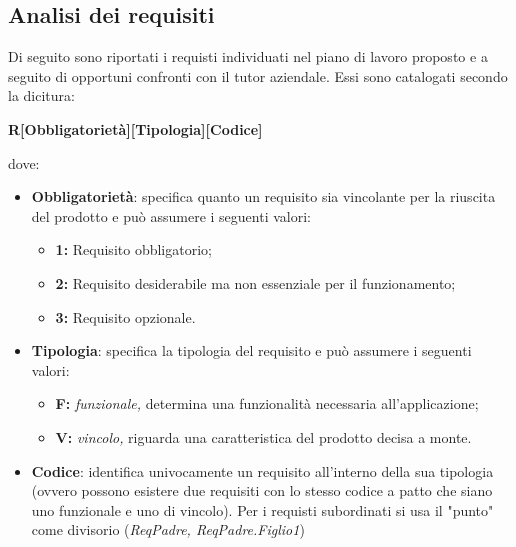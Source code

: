 \subsection{Analisi dei requisiti}
Di seguito sono riportati i requisti individuati nel piano di lavoro proposto e a seguito di opportuni confronti con il tutor aziendale. Essi sono catalogati secondo la dicitura:
\begin{center}
    \textbf{R[Obbligatorietà][Tipologia][Codice]}
\end{center}
dove:
\begin{itemize}
    \item \textbf{Obbligatorietà}: specifica quanto un requisito sia vincolante per la riuscita del prodotto e può assumere i seguenti valori:
    \begin{itemize}
        \item \textbf{1: } Requisito obbligatorio;
        \item \textbf{2: } Requisito desiderabile ma non essenziale per il funzionamento;
        \item \textbf{3: } Requisito opzionale.
    \end{itemize}
    \item \textbf{Tipologia}: specifica la tipologia del requisito e può assumere i seguenti valori:
    \begin{itemize}
        \item \textbf{F: }\textit{funzionale,} determina una funzionalità necessaria all'applicazione;
        \item \textbf{V: }\textit{vincolo,} riguarda una caratteristica del prodotto decisa a monte.
    \end{itemize}
    \item \textbf{Codice}: identifica univocamente un requisito all'interno della sua tipologia (ovvero possono esistere due requisiti con lo stesso codice a patto che siano uno funzionale e uno di vincolo). Per i requisti subordinati si usa il "punto" come divisorio (\textit{ReqPadre, ReqPadre.Figlio1})
\end{itemize}

